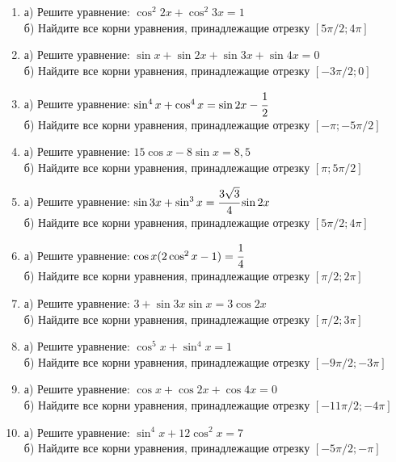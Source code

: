 \documentclass[12pt]{article}
\begin{document}
\begin{enumerate}[start=1,label={\itshape\bfseries \arabic*.}]

\item а) Решите уравнение: $\cos^2{2x} + \cos^2{3x} = 1$\\
      б) Найдите все корни уравнения, принадлежащие отрезку $[5\pi / 2; 4\pi]$

\item а) Решите уравнение: $\sin{x} + \sin{2x} + \sin{3x} + \sin{4x} = 0$\\
      б) Найдите все корни уравнения, принадлежащие отрезку $[- 3\pi / 2; 0]$

\item а) Решите уравнение: $\sin^4{x} + \cos^4{x} = \sin{2x} - \cfrac{1}{2}$\\
      б) Найдите все корни уравнения, принадлежащие отрезку $[-\pi; - 5\pi / 2]$

\item а) Решите уравнение: $15\cos{x} - 8\sin{x} = 8,5$\\
      б) Найдите все корни уравнения, принадлежащие отрезку $[\pi; 5\pi / 2]$

\item а) Решите уравнение: $\sin{3x} + \sin^3{x} = \cfrac{3\sqrt{3}}{4}\sin{2x}$\\
      б) Найдите все корни уравнения, принадлежащие отрезку $[5\pi / 2; 4\pi]$

\item а) Решите уравнение: $\cos{x}(2\cos^2{x} - 1) = \cfrac{1}{4}$\\
      б) Найдите все корни уравнения, принадлежащие отрезку $[\pi / 2; 2\pi]$

\item а) Решите уравнение: $3 + \sin{3x}\sin{x} = 3\cos{2x}$\\
      б) Найдите все корни уравнения, принадлежащие отрезку $[\pi / 2; 3\pi]$

\item а) Решите уравнение: $\cos^5{x} + \sin^4{x} = 1$\\
      б) Найдите все корни уравнения, принадлежащие отрезку $[-9\pi / 2; -3\pi]$

\item а) Решите уравнение: $\cos{x} + \cos{2x} + \cos{4x} = 0$\\
      б) Найдите все корни уравнения, принадлежащие отрезку $[-11\pi / 2; -4\pi]$

\item а) Решите уравнение: $\sin^4{x} + 12\cos^2{x} = 7$\\
      б) Найдите все корни уравнения, принадлежащие отрезку $[-5\pi / 2; -\pi]$


\end{enumerate}
\end{document}
